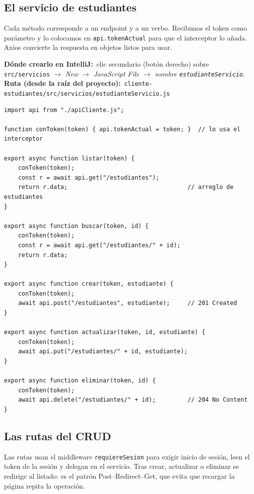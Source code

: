 \documentclass[11pt]{article}
\newcommand{\dondecrear}[3]{\begin{ubic}{\footnotesize\textbf{\color{ndverdeo}D\'onde crearlo en IntelliJ:}~clic secundario (bot\'on derecho) sobre \texttt{#1} $\rightarrow$ \emph{New} $\rightarrow$ \emph{#2}.\\[2pt]\textbf{\color{ndverdeo}Ruta (desde la ra\'iz del proyecto):}~\texttt{#3}}\end{ubic}\nobreak\vspace{3pt}}
\begin{document}
\subsection{El servicio de estudiantes}
Cada método corresponde a un endpoint y a un verbo. Recibimos el token como parámetro y lo colocamos en \texttt{api.\allowbreak{}token\allowbreak{}Actual} para que el interceptor lo añada. Axios convierte la respuesta en objetos listos para usar.

\dondecrear{src/servicios}{JavaScript File $\rightarrow$ nombre \texttt{estudianteServicio}}{cliente-estudiantes/src/servicios/estudianteServicio.js}
\begin{cajacodigo}
\begin{lstlisting}[style=js]
import api from "./apiCliente.js";

function conToken(token) { api.tokenActual = token; }  // lo usa el interceptor

export async function listar(token) {
	conToken(token);
	const r = await api.get("/estudiantes");
	return r.data;                                  // arreglo de estudiantes
}

export async function buscar(token, id) {
	conToken(token);
	const r = await api.get("/estudiantes/" + id);
	return r.data;
}

export async function crear(token, estudiante) {
	conToken(token);
	await api.post("/estudiantes", estudiante);     // 201 Created
}

export async function actualizar(token, id, estudiante) {
	conToken(token);
	await api.put("/estudiantes/" + id, estudiante);
}

export async function eliminar(token, id) {
	conToken(token);
	await api.delete("/estudiantes/" + id);         // 204 No Content
}
\end{lstlisting}
\end{cajacodigo}
\vspace{2pt}

\subsection{Las rutas del CRUD}
Las rutas usan el middleware \texttt{requiere\allowbreak{}Sesion} para exigir inicio de sesión, leen el token de la sesión y delegan en el servicio. Tras crear, actualizar o eliminar se redirige al listado: es el patrón Post--Redirect--Get, que evita que recargar la página repita la operación.
\end{document}
